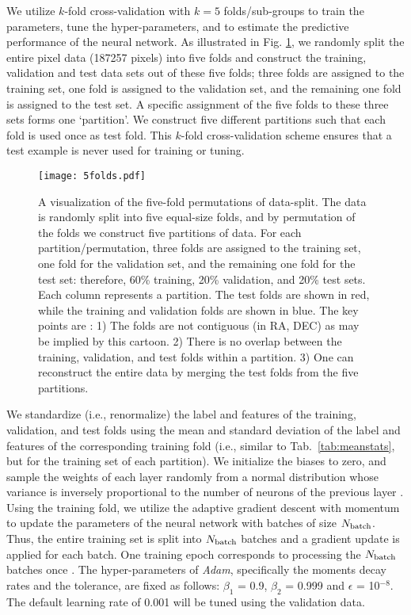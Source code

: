 \documentclass[fleqn, usenatbib]{mnras}
\begin{document}
We utilize  $k$-fold cross-validation with $k=5$ folds/sub-groups to train the parameters, tune the hyper-parameters, and to estimate the predictive performance of the neural network. As illustrated in Fig. \ref{fig:5fold}, we randomly split the entire pixel data (187257 pixels) into five folds and construct the training, validation and test data sets out of these five folds; three folds are assigned to the training set, one fold is assigned to the validation set, and the remaining one fold is assigned to the test set. A specific assignment of the five folds to these three sets forms one `partition'. We construct five different partitions such that each fold is used once as test fold. This $k$-fold cross-validation scheme ensures that a test example is never used for training or tuning.\\

\begin{figure}
         \centering
         \texttt{[image: 5folds.pdf]}
         \caption{A visualization of the five-fold permutations of data-split. The data is randomly split into five equal-size folds, and by permutation of the folds we construct five partitions of data. For each partition/permutation, three folds are assigned to the training set, one fold for the validation set, and the remaining one fold for the test set: therefore, 60\% training, 20\% validation, and 20\% test sets. Each column represents a partition. The test folds are shown in red, while the training and validation folds are shown in blue. The key points are : 1) The folds are not contiguous (in RA, DEC) as may be implied by this cartoon. 2) There is no overlap between the training, validation, and test folds within a partition. 3) One can reconstruct the entire data by merging the test folds from the five partitions.}
         \label{fig:5fold}
     \end{figure}
     
     
We standardize (i.e., renormalize) the label and features of the training, validation, and test folds using the mean and standard deviation of the label and features of the corresponding training fold (i.e., similar to Tab.~\ref{tab:meanstats}, but for the training set of each partition). We initialize the biases to zero, and sample the weights of each layer randomly from a normal distribution whose variance is inversely proportional to the number of neurons of the previous layer \citep[see e.g.,][]{he2015delving}. Using the training fold, we utilize the adaptive gradient descent with momentum \citep[\textit{Adam},][]{kingma2014adam} to update the parameters of the neural network with batches of size $N_{{\rm batch}}$. Thus, the entire training set is split into $N_{{\rm batch}}$ batches and a gradient update is applied for each batch. One training epoch corresponds to processing the $N_{{\rm batch}}$ batches once \citep[for more details on the training procedure, we refer the reader to see e.g.,][]{ruder2016overview}. The hyper-parameters of \textit{Adam}, specifically the moments decay rates and the tolerance, are fixed as follows: $\beta_{1}$ = 0.9, $\beta_{2}$ = 0.999 and $\epsilon$ = 10$^{-8}$. The default learning rate of 0.001 will be tuned using the validation data.\\ 
\end{document}
